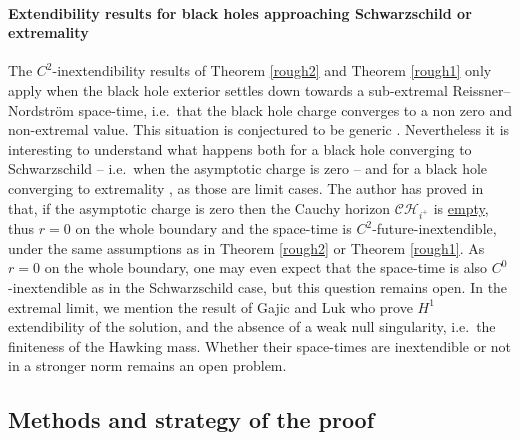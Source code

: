 \documentclass[10pt,a4paper]{article}
\theoremstyle{plain}
\theoremstyle{remark}
\theoremstyle{definition}
\theoremstyle{plain}
\theoremstyle{remark}
\theoremstyle{definition}
\newcommand{\CH}{\mathcal{CH}_{i^+}}
\numberwithin{equation}{section}
\begin{document}
\paragraph{Extendibility results for black holes approaching Schwarzschild or extremality}
The $C^2$-inextendibility results of Theorem \ref{rough2} and Theorem \ref{rough1} only apply when the black hole exterior settles down towards a sub-extremal Reissner--Nordstr\"{o}m space-time, i.e.\ that the black hole charge converges to a non zero and non-extremal value. This situation is conjectured to be generic \cite{Kommemi}. Nevertheless it is interesting to understand what happens both for a black hole converging to Schwarzschild -- i.e.\ when the asymptotic charge is zero -- and for a black hole converging to extremality , as those are limit cases. The author has proved in \cite{MoiThesis} that, if the asymptotic charge is zero then the Cauchy horizon $\CH$ is \underline{empty}, thus $r=0$ on the whole boundary and the space-time is $C^2$-future-inextendible, under the same assumptions as in Theorem \ref{rough2} or Theorem \ref{rough1}. As $r=0$ on the whole boundary, one may even expect that the space-time is also $C^0$-inextendible as in the Schwarzschild case, but this question remains open. In the extremal limit, we mention the result of Gajic and Luk \cite{extremeJonathan} who prove $H^1$ extendibility of the solution, and the absence of a weak null singularity, i.e.\ the finiteness of the Hawking mass. Whether their space-times are inextendible or not in a stronger norm remains an open problem.


\subsection{Methods and strategy of the proof}  \label{outline}
\end{document}
